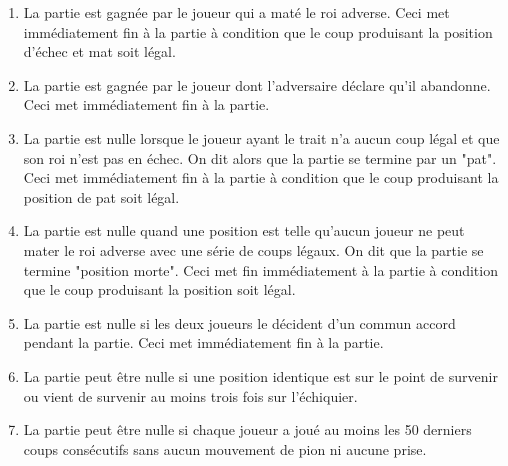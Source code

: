 \begin{enumerate}

\item La partie est gagnée par le joueur qui a maté le roi adverse. Ceci met immédiatement fin à la partie
à condition que le coup produisant la position d’échec et mat soit légal.

\item La partie est gagnée par le joueur dont l’adversaire déclare qu’il abandonne. Ceci met
immédiatement fin à la partie.

\item La partie est nulle lorsque le joueur ayant le trait n’a aucun coup légal et que son roi n’est pas en
échec. On dit alors que la partie se termine par un "pat". Ceci met immédiatement fin à la partie à
condition que le coup produisant la position de pat soit légal.

\item La partie est nulle quand une position est telle qu’aucun joueur ne peut mater le roi adverse avec
une série de coups légaux. On dit que la partie se termine "position morte". Ceci met fin
immédiatement à la partie à condition que le coup produisant la position soit légal.

\item La partie est nulle si les deux joueurs le décident d’un commun accord pendant la partie. Ceci met
immédiatement fin à la partie.

\item La partie peut être nulle si une position identique est sur le point de survenir ou vient de survenir au
moins trois fois sur l’échiquier.

\item La partie peut être nulle si chaque joueur a joué au moins les 50 derniers coups consécutifs sans
aucun mouvement de pion ni aucune prise.

\end{enumerate}
